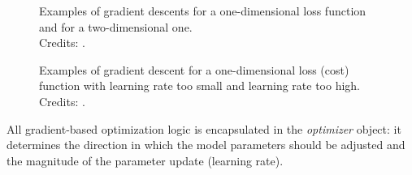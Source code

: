 \begin{figure}
  \centering
  \hfill
  \caption[One/two-dimensional gradient descents]{Examples of gradient descents for a \protect{} one-dimensional loss function and for a \protect{} two-dimensional one.\\\small{Credits: \cite{geron_hands-machine_2019,amini_spatial_2018}.}}
  \label{fig:grad_descent}
\end{figure}

\begin{figure}
  \centering
  \hfill
  \caption[Examples of learning rates too small or too high]{Examples of gradient descent for a one-dimensional loss (cost) function with \protect{} learning rate too small and \protect{} learning rate too high.\\\small{Credits: \cite{geron_hands-machine_2019}.}}
  \label{fig:lr_small_high}
\end{figure}
\newpage
All gradient-based optimization logic is encapsulated in the \emph{optimizer} object: it determines the direction in which the model parameters should be adjusted and the magnitude of the parameter update (learning rate).

